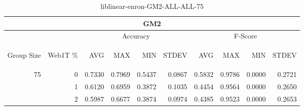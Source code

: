 \begin{center}
\begin{table}[htbp] 
 \begin{center}
\begin{tabular}{ | r | r | r | r | r | r | r | r | r | r |}
\hline
\multicolumn{10}{|c|}{GM2}\\
\hline
 & & \multicolumn{4}{|c|}{Accuracy} & \multicolumn{4}{|c|}{F-Score}\\ \cline{3-10}
\begin{sideways}Group Size\end{sideways} & \begin{sideways}Web1T \%\end{sideways} & \begin{sideways}AVG\end{sideways} & \begin{sideways}MAX\end{sideways} & \begin{sideways}MIN\end{sideways} & \begin{sideways}STDEV\end{sideways} & \begin{sideways}AVG\end{sideways} & \begin{sideways}MAX\end{sideways} & \begin{sideways}MIN\end{sideways} & \begin{sideways}STDEV\end{sideways}\\
\hline
\multirow{2}{*}{75}
 & 0 & 0.7330 & 0.7969 & 0.5437 & 0.0867 & 0.5832 & 0.9786 & 0.0000 & 0.2721\\ \cline{2-10}
 & 1 & 0.6120 & 0.6959 & 0.3872 & 0.1035 & 0.4454 & 0.9564 & 0.0000 & 0.2650\\ \cline{2-10}
 & 2 & 0.5987 & 0.6677 & 0.3874 & 0.0974 & 0.4385 & 0.9523 & 0.0000 & 0.2653\\ \cline{2-10}
\hline
\end{tabular}
\caption{liblinear-enron-GM2-ALL-ALL-75}
\label{table:liblinear-enron-GM2-ALL-ALL-75}
\end{center}
 \end{table}
\end{center}

